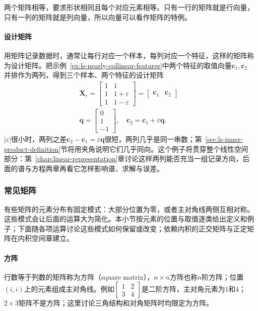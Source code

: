 两个矩阵相等，要求形状相同且每个对应元素相等。只有一行的矩阵就是行向量，只有一列的矩阵就是列向量，所以向量可以看作矩阵的特例。

\paragraph{设计矩阵}
用矩阵记录数据时，通常让每行对应一个样本，每列对应一个特征，这样的矩阵称为设计矩阵。把示例~\ref{ex:ls-nearly-collinear-features}中两个特征的取值向量$\bm c_1,\bm c_2$并排作为两列，得到三个样本、两个特征的设计矩阵
\begin{equation}
\begin{gathered}
\bm X_{\varepsilon}
 =\begin{bmatrix}1&1\\1&1+\varepsilon\\1&1-\varepsilon\end{bmatrix}
 =\begin{bmatrix}\bm c_1&\bm c_2\end{bmatrix}\\
\bm q=\begin{bmatrix}0\\1\\-1\end{bmatrix},
 \quad \bm c_2=\bm c_1+\varepsilon\bm q.
\end{gathered}
\label{eq:linear-algebra-nearly-collinear-design}
\end{equation}
$|\varepsilon|$很小时，两列之差$\bm c_2-\bm c_1=\varepsilon\bm q$很短，两列几乎是同一串数；第~\ref{sec:ls-inner-product-definition}节将用夹角说明它们几乎同向。这个例子将贯穿整个线性空间部分：第~\ref{chap:linear-representation}章讨论这样两列能否充当一组记录方向，后面的谱与方程两章再看它怎样影响谱、求解与误差。

\subsubsection{常见矩阵}
\label{sec:prelim-common-matrices}

有些矩阵的元素分布有固定模式：大部分位置为零，或者主对角线两侧互相对称。这些模式会让后面的运算大为简化。本小节按元素的位置与取值逐类给出定义和例子；下面随各项运算讨论这些模式如何保留或改变；依赖内积的正交矩阵与正定矩阵在内积空间章建立。

\paragraph{方阵}
行数等于列数的矩阵称为方阵（square matrix），$n\times n$方阵也称$n$阶方阵；位置$(i,i)$上的元素组成主对角线。例如$\left[\begin{smallmatrix}1&2\\3&4\end{smallmatrix}\right]$是二阶方阵，主对角元素为$1$和$4$；$2\times3$矩阵不是方阵；这里讨论三角结构和对角矩阵时均限定为方阵。

